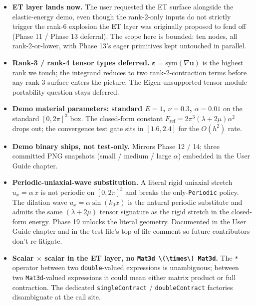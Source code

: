 \begin{itemize}
\tightlist
\item
  \textbf{ET layer lands now.} The user requested the ET surface
  alongside the elastic-energy demo, even though the rank-2-only
  inputs do not strictly trigger the rank-6 explosion the ET layer was
  originally proposed to fend off (Phase 11 / Phase 13 deferral). The
  scope here is bounded: ten nodes, all rank-2-or-lower, with
  Phase 13's eager primitives kept untouched in parallel.
\item
  \textbf{Rank-3 / rank-4 tensor types deferred.}
  \(\boldsymbol\varepsilon = \mathrm{sym}(\nabla\mathbf u)\) is the
  highest rank we touch; the integrand reduces to two
  rank-2-contraction terms before any rank-3 surface enters the
  picture. The Eigen-unsupported-tensor-module portability question
  stays deferred.
\item
  \textbf{Demo material parameters: standard \(E = 1\), \(\nu = 0.3\),
  \(\alpha = 0.01\)} on the standard \([0, 2\pi]^3\) box. The
  closed-form constant \(F_{\mathrm{ref}} = 2\pi^3(\lambda + 2\mu)\alpha^2\)
  drops out; the convergence test gate sits in
  \([1.6, 2.4]\) for the \(O(h^2)\) rate.
\item
  \textbf{Demo binary ships, not test-only.} Mirrors Phase 12 / 14;
  three committed PNG snapshots (small / medium / large \(\alpha\))
  embedded in the User Guide chapter.
\item
  \textbf{Periodic-uniaxial-wave substitution.} A literal rigid
  uniaxial stretch \(u_x = \alpha\,x\) is not periodic on
  \([0, 2\pi]^3\) and breaks the only-\passthrough{\lstinline!Periodic!}
  policy. The dilation wave \(u_x = \alpha\sin(k_0 x)\) is the natural
  periodic substitute and admits the same \((\lambda + 2\mu)\) tensor
  signature as the rigid stretch in the closed-form energy. Phase 19
  unlocks the literal geometry. Documented in the User Guide chapter
  and in the test file's top-of-file comment so future contributors
  don't re-litigate.
\item
  \textbf{Scalar \(\times\) scalar in the ET layer, no
  \passthrough{\lstinline!Mat3d \(\times\) Mat3d!}.} The
  \passthrough{\lstinline!*!} operator between two
  \passthrough{\lstinline!double!}-valued expressions is unambiguous;
  between two \passthrough{\lstinline!Mat3d!}-valued expressions it
  could mean either matrix product or full contraction. The dedicated
  \passthrough{\lstinline!singleContract!} /
  \passthrough{\lstinline!doubleContract!} factories disambiguate at
  the call site.
\end{itemize}

